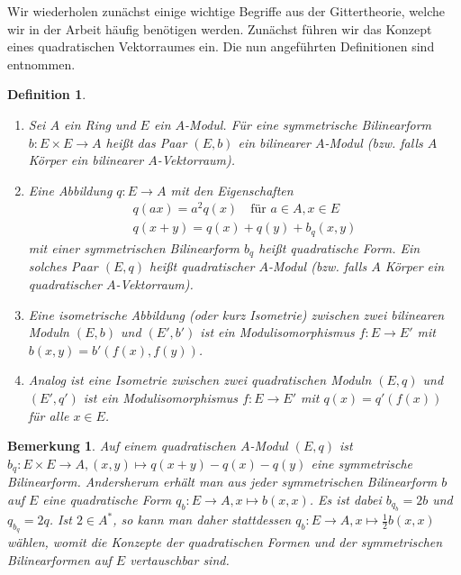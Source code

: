 \documentclass[12pt,a4paper,halfparskip,headsepline,bibtotocnumbered]{scrreprt}
\theoremstyle{nummermitklammern}
\newtheorem{definition}[defsatzusw]{Definition}
\newtheorem{bemerkung}[defsatzusw]{Bemerkung}
\theoremstyle{nonumberbreak}
\begin{document}
Wir wiederholen zunächst einige wichtige Begriffe aus der Gittertheorie, welche wir in der Arbeit häufig benötigen werden. Zunächst führen wir das Konzept eines quadratischen Vektorraumes ein. Die nun angeführten Definitionen sind \cite[Def. (2.1)]{kneser} entnommen.

\begin{framed}
	\begin{definition}
		\begin{enumerate}[label=(\roman*)]
			\item Sei $A$ ein Ring und $E$ ein $A$-Modul. Für eine symmetrische Bilinearform\linebreak
				$b : E \times E \rightarrow A$ heißt das Paar $(E,b)$ ein \textit{bilinearer $A$-Modul} (bzw. falls $A$ Körper ein \textit{bilinearer $A$-Vektorraum}).
			\item Eine Abbildung $q : E \rightarrow A$ mit den Eigenschaften
				\begin{align*}
					q(ax) = a^2 q(x)\quad \text{für } a \in A, x \in E\\
					q(x+y) = q(x) + q(y) + b_q(x,y)
				\end{align*}
				mit einer symmetrischen Bilinearform $b_q$ heißt \textit{quadratische Form}. Ein solches Paar $(E,q)$ heißt \textit{quadratischer $A$-Modul} (bzw. falls $A$ Körper ein \textit{quadratischer $A$-Vektorraum}).
			\item Eine \textit{isometrische Abbildung} (oder kurz \textit{Isometrie}) zwischen zwei bilinearen Moduln $(E,b)$ und $(E', b')$ ist ein Modulisomorphismus $f : E \rightarrow E'$ mit $b(x,y) = b'(f(x), f(y))$.
			\item Analog ist eine Isometrie zwischen zwei quadratischen Moduln $(E,q)$ und $(E', q')$ ist ein Modulisomorphismus $f : E \rightarrow E'$ mit $q(x) = q'(f(x))$ für alle $x \in E$.
		\end{enumerate}
	\end{definition}
\end{framed}

\begin{bemerkung}
	Auf einem quadratischen $A$-Modul $(E,q)$ ist $b_q : E \times E \rightarrow A, (x,y) \mapsto q(x+y) - q(x) - q(y)$ eine symmetrische Bilinearform. Andersherum erhält man aus jeder symmetrischen Bilinearform $b$ auf $E$ eine quadratische Form $q_b : E \rightarrow A, x \mapsto b(x,x)$. Es ist dabei $b_{q_b} = 2b$ und $q_{b_q} = 2q$. Ist $2 \in A^*$, so kann man daher stattdessen $q_b : E \rightarrow A, x \mapsto \frac{1}{2} b(x,x)$ wählen, womit die Konzepte der quadratischen Formen und der symmetrischen Bilinearformen auf $E$ vertauschbar sind.
\end{bemerkung}
\end{document}
